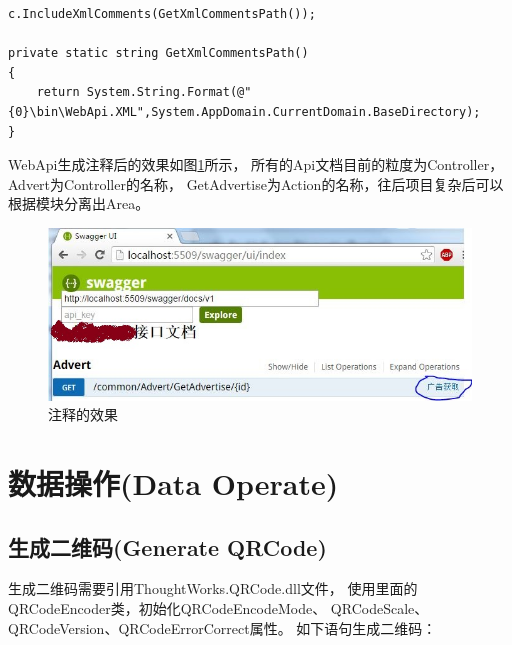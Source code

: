 \documentclass{book}
\begin{document}
\begin{lstlisting}[language={[Sharp]C},caption=Swagger指定注释文档的位置]
c.IncludeXmlComments(GetXmlCommentsPath());

private static string GetXmlCommentsPath()
{
    return System.String.Format(@"{0}\bin\WebApi.XML",System.AppDomain.CurrentDomain.BaseDirectory);
}
\end{lstlisting}

WebApi生成注释后的效果如图\ref{fig:WebApiCommentUI}所示，
所有的Api文档目前的粒度为Controller，Advert为Controller的名称，
GetAdvertise为Action的名称，往后项目复杂后可以根据模块分离出Area。

\begin{figure}[htbp]
	\centering
	\includegraphics[scale=0.8]{WebApiCommentUI.jpg}
	\caption{注释的效果}
	\label{fig:WebApiCommentUI}
\end{figure}


\chapter{数据操作(Data Operate)}

\clearpage
\mbox{}         
\clearpage

\section{生成二维码(Generate QRCode)}

生成二维码需要引用ThoughtWorks.QRCode.dll文件，
使用里面的QRCodeEncoder类，初始化QRCodeEncodeMode、
QRCodeScale、QRCodeVersion、QRCodeErrorCorrect属性。
如下语句生成二维码：
\end{document}
